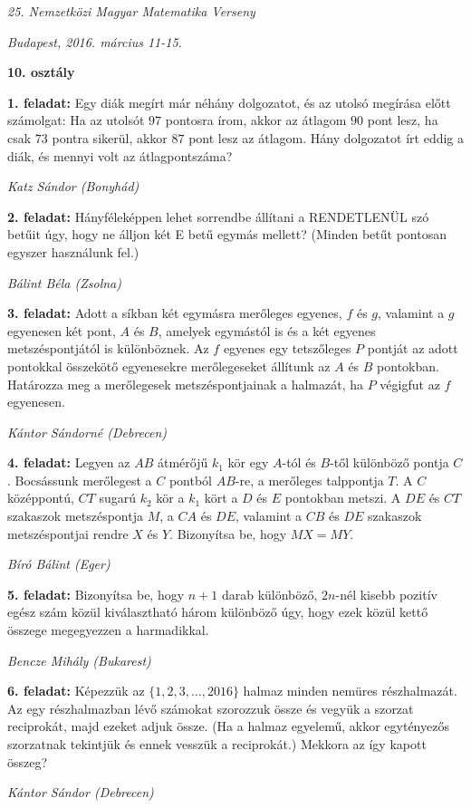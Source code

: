 \documentclass[a4paper,10pt]{article}
\newcommand{\ki}[2]{\hfill {\it #1 (#2)}\medskip}
\begin{document}
\begin{center} \Large {\em 25. Nemzetközi Magyar Matematika Verseny} \end{center}
\begin{center} \large{\em Budapest, 2016. március 11-15.} \end{center}
\smallskip
\begin{center} \large{\bf 10. osztály} \end{center}
\bigskip 

{\bf 1. feladat: } Egy diák megírt már néhány dolgozatot, és az utolsó megírása előtt számolgat: Ha az utolsót $97$ pontosra írom, akkor az átlagom $90$ pont lesz, ha csak $73$ pontra sikerül, akkor $87$ pont lesz az átlagom. Hány dolgozatot írt eddig a diák, és mennyi volt az átlagpontszáma?

\ki{Katz Sándor}{Bonyhád}\medskip

{\bf 2. feladat: } Hányféleképpen lehet sorrendbe állítani a RENDETLENÜL szó betűit úgy, hogy ne álljon két E betű egymás mellett?  (Minden betűt pontosan egyszer használunk fel.)

\ki{Bálint Béla}{Zsolna}\medskip

{\bf 3. feladat: } Adott a síkban két egymásra merőleges egyenes, $f$ és $g$, valamint a $g$ egyenesen két pont, $A$ és $B$, amelyek egymástól is és a két egyenes metszéspontjától is különböznek. Az $f$ egyenes egy tetszőleges $P$ pontját az adott pontokkal összekötő egyenesekre merőlegeseket állítunk az $A$ és $B$ pontokban. Határozza meg a merőlegesek metszéspontjainak a halmazát, ha $P$ végigfut az $f$ egyenesen.

\ki{Kántor Sándorné}{Debrecen}\medskip

{\bf 4. feladat: } Legyen az $AB$ átmérőjű $k_1$ kör egy $A$-tól és $B$-től különböző pontja $C$. \mbox{Bocsássunk} merőlegest a $C$ pontból $AB$-re, a merőleges talppontja $T$. A $C$ középpontú, $CT$ sugarú $k_2$ kör a $k_1$ kört a $D$ és $E$ pontokban metszi. A $DE$ és $CT$ szakaszok metszéspontja $M$, a $CA$ és $DE$, valamint a $CB$ és $DE$ szakaszok metszéspontjai rendre $X$ és $Y$. Bizonyítsa be, hogy $MX=MY$.

\ki{Bíró Bálint}{Eger} \medskip

{\bf 5. feladat: } Bizonyítsa be, hogy  $n+1$ darab különböző, $2n$-nél kisebb  pozitív egész szám közül kiválasztható  három különböző úgy, hogy ezek közül kettő összege megegyezzen a harmadikkal.

\ki{Bencze Mihály}{Bukarest}\medskip

{\bf 6. feladat: } Képezzük az $\{1, 2, 3, \ldots, 2016\}$ halmaz minden nemüres részhalmazát. Az egy részhalmazban lévő számokat  szorozzuk össze  és vegyük a szorzat reciprokát, majd ezeket adjuk össze. (Ha a halmaz egyelemű, akkor egytényezős szorzatnak tekintjük és ennek vesszük a reciprokát.) Mekkora az így kapott összeg?

\ki{Kántor Sándor}{Debrecen}\medskip
\end{document}
